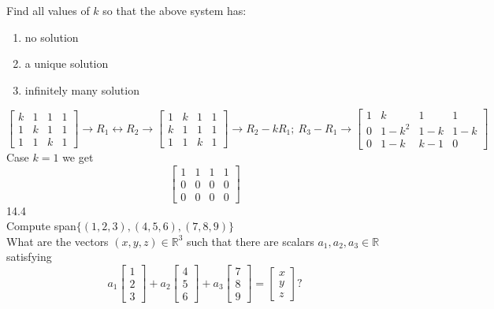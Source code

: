 \documentclass[]{article}
\begin{document}
                Find all values of $k$ so that the above system has:
                \begin{enumerate}
                  \item no solution
                  \item a unique solution
                  \item infinitely many solution
                \end{enumerate}
                $$
                \left[\begin{array}{ccc|c}
                    {k}&{1}&{1}&{1}\\
                    {1}&{k}&{1}&{1}\\
                    {1}&{1}&{k}&{1}
                \end{array}\right]\rightarrow R_1\leftrightarrow
              R_2\rightarrow
              \left[\begin{array}{ccc|c}
                  {1}&{k}&{1}&{1}\\
                  {k}&{1}&{1}&{1}\\
                  {1}&{1}&{k}&{1}
                \end{array}\right]\rightarrow
              R_2-kR_1;~R_3-R_1\rightarrow
              \left[\begin{array}{ccc|c}
                  {1}&{k}&{1}&{1}\\
                  {0}&{1-k^2}&{1-k}&{1-k}\\
                  {0}&{1-k}&{k-1}&{0}
                \end{array}\right]
                $$
                Case $k=1$ we get
                $$
                \left[\begin{array}{ccc|c}
                    {1}&{1}&{1}&{1}\\
                    {0}&{0}&{0}&{0}\\
                    {0}&{0}&{0}&{0}
                  \end{array}\right]
                $$
                \large{14.4}\\
                \normalsize
                Compute span$\{(1,2,3),(4,5,6),(7,8,9)\}$\\
                What are the vectors $(x,y,z)\in\mathbb{R}^3$ such
                that there are scalars $a_1,a_2,a_3\in\mathbb{R}$
                satisfying
                $$
                a_1\begin{bmatrix}{1}\\{2}\\{3}\end{bmatrix}+a_2\begin{bmatrix}{4}\\{5}\\{6}\end{bmatrix}+a_3\begin{bmatrix}{7}\\{8}\\{9}\end{bmatrix}=\begin{bmatrix}{x}\\{y}\\{z}\end{bmatrix}?
                $$
\end{document}
